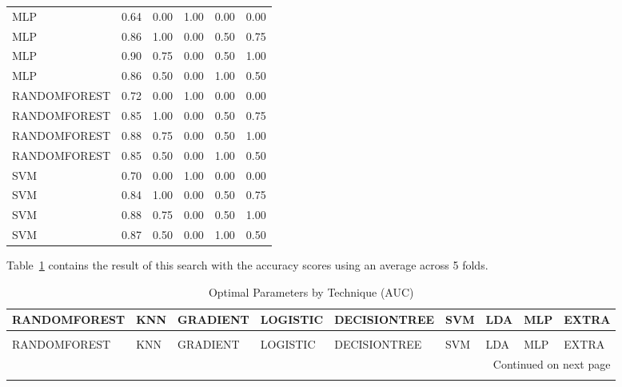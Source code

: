 \documentclass[letterpaper]{article}
\begin{document}
{\begin{small}
{\begin{longtable}{lrrrrr}
         MLP & 0.64 &      0.00 & 1.00 &       0.00 &       0.00 \\
         MLP & 0.86 &      1.00 & 0.00 &       0.50 &       0.75 \\
         MLP & 0.90 &      0.75 & 0.00 &       0.50 &       1.00 \\
         MLP & 0.86 &      0.50 & 0.00 &       1.00 &       0.50 \\
RANDOMFOREST & 0.72 &      0.00 & 1.00 &       0.00 &       0.00 \\
RANDOMFOREST & 0.85 &      1.00 & 0.00 &       0.50 &       0.75 \\
RANDOMFOREST & 0.88 &      0.75 & 0.00 &       0.50 &       1.00 \\
RANDOMFOREST & 0.85 &      0.50 & 0.00 &       1.00 &       0.50 \\
         SVM & 0.70 &      0.00 & 1.00 &       0.00 &       0.00 \\
         SVM & 0.84 &      1.00 & 0.00 &       0.50 &       0.75 \\
         SVM & 0.88 &      0.75 & 0.00 &       0.50 &       1.00 \\
         SVM & 0.87 &      0.50 & 0.00 &       1.00 &       0.50 \\
\end{longtable}




}
\end{small}
Table~\ref{table:optimal-auc} contains the result of this search with the accuracy scores using an average across 5 folds.



\begin{tiny}
\begin{longtable}{lllllllll}
\caption[Optimal Parameters for AUC]{Optimal Parameters by Technique (AUC)}
\label{table:optimal-auc}\\
\toprule
RANDOMFOREST &             KNN &        GRADIENT &         LOGISTIC &       DECISIONTREE &             SVM &
        LDA &                             MLP &            EXTRA \\
\midrule
\endfirsthead
\caption[]{Optimal Parameters by Technique (AUC)} \\
\toprule
RANDOMFOREST &             KNN &        GRADIENT &         LOGISTIC &       DECISIONTREE &             SVM &
        LDA &                             MLP &            EXTRA \\
\midrule
\endhead
\midrule
\multicolumn{9}{r}{{Continued on next page}} \\
\midrule
\endfoot


\end{longtable}
\end{tiny}}
\end{document}
